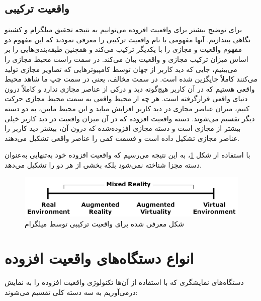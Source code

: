 \subsection{واقعیت ترکیبی}
برای توضیح بیشتر برای واقعیت افزوده می‌توانیم به نتیجه تحقیق میلگرام و کشینو نگاهی بیندازیم\cite{Milgram}. آنها مفهومی با نام واقعیت ترکیبی را معرفی نمودند که این مفهوم دو مفهوم واقعیت و مجازی را با یکدیگر ترکیب می‌کند و همچنین طبقه‌بندی‌هایی را بر اساس میزان ترکیب مجازی و واقعیت بیان می‌کند. در سمت راست محیط مجازی را می‌بینیم، جایی که دید کاربر از جهان توسط کامپیوترهایی که تصاویر مجازی تولید می‌کنند کاملاً جایگزین شده است. در سمت مخالف، یعنی در سمت چپ ما شاهد محیط واقعی هستیم که در آن کاربر هیچ‌گونه دید و درکی از عناصر مجازی ندارد و کاملاً درون دنیای واقعی قرارگرفته است. هر چه از محیط واقعی به سمت محیط مجازی حرکت کنیم، میزان عناصر مجازی در دید کاربر افزایش میابد و این محیط مابین، به دو دسته دیگر تقسیم می‌شوند. دسته واقعیت افزوده که در آن میزان واقعیت در دید کاربر خیلی بیشتر از مجازی است و دسته مجازی افزوده‌شده که درون آن، بیشتر دید کاربر را عناصر مجازی تشکیل داده است و قسمت کمی را عناصر واقعی تشکیل می‌دهند.

با استفاده از شکل \ref{fig:Mixed}، به این نتیجه می‌رسیم که واقعیت افزوده خود به‌تنهایی به‌عنوان دسته مجزا شناخته نمی‌شود بلکه بخشی از هر دو را تشکیل می‌دهد.

\begin{figure}[!ht]
	\centering
	\includegraphics[width=1\linewidth]{image/mixedreality}
	\caption {شکل معرفی شده برای واقعیت ترکیبی توسط میلگرام\cite{Milgram}}
	\label{fig:Mixed}
\end{figure}

\section{انواع دستگاه‌های واقعیت افزوده}

دستگاه‌های نمایشگری که با استفاده از آن‌ها تکنولوژی واقعیت افزوده را به نمایش درمی‌آوریم به سه دسته کلی تقسیم می‌شوند\cite{Julie}:
\\
